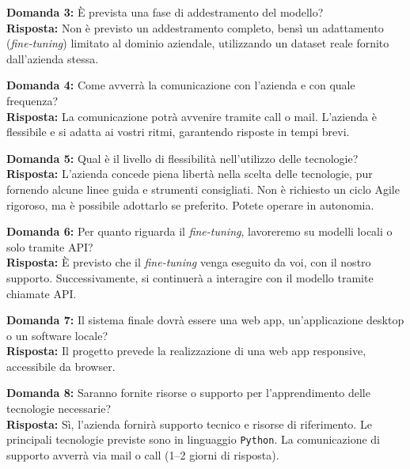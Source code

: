 \documentclass[a4paper,12pt]{article}
\begin{document}
\vspace{2em}

\textbf{Domanda 3:} È prevista una fase di addestramento del modello?\\[0.5em]
\textbf{Risposta:} Non è previsto un addestramento completo, bensì un adattamento (\textit{fine-tuning}) limitato al dominio aziendale, utilizzando un dataset reale fornito dall’azienda stessa.

\vspace{2em}

\textbf{Domanda 4:} Come avverrà la comunicazione con l’azienda e con quale frequenza?\\[0.5em]
\textbf{Risposta:} La comunicazione potrà avvenire tramite call o mail. L’azienda è flessibile e si adatta ai vostri ritmi, garantendo risposte in tempi brevi.

\vspace{2em}

\textbf{Domanda 5:} Qual è il livello di flessibilità nell’utilizzo delle tecnologie?\\[0.5em]
\textbf{Risposta:} L’azienda concede piena libertà nella scelta delle tecnologie, pur fornendo alcune linee guida e strumenti consigliati. Non è richiesto un ciclo Agile rigoroso, ma è possibile adottarlo se preferito. Potete operare in autonomia.

\vspace{2em}

\textbf{Domanda 6:} Per quanto riguarda il \textit{fine-tuning}, lavoreremo su modelli locali o solo tramite API?\\[0.5em]
\textbf{Risposta:} È previsto che il \textit{fine-tuning} venga eseguito da voi, con il nostro supporto. Successivamente, si continuerà a interagire con il modello tramite chiamate API.

\vspace{2em}

\textbf{Domanda 7:} Il sistema finale dovrà essere una web app, un’applicazione desktop o un software locale?\\[0.5em]
\textbf{Risposta:} Il progetto prevede la realizzazione di una web app responsive, accessibile da browser.

\vspace{2em}

\textbf{Domanda 8:} Saranno fornite risorse o supporto per l’apprendimento delle tecnologie necessarie?\\[0.5em]
\textbf{Risposta:} Sì, l’azienda fornirà supporto tecnico e risorse di riferimento. Le principali tecnologie previste sono in linguaggio \texttt{Python}. La comunicazione di supporto avverrà via mail o call (1–2 giorni di risposta).
\end{document}
